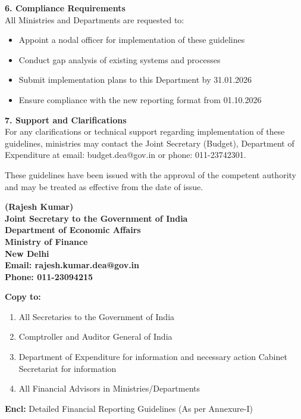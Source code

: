 \documentclass[12pt,a4paper]{article}
\newcommand{\officeline}[1]{\textbf{#1}}
\begin{document}
\vspace{0.3cm}

\officeline{6. Compliance Requirements}\\
All Ministries and Departments are requested to:

\begin{itemize}
    \item Appoint a nodal officer for implementation of these guidelines
    \item Conduct gap analysis of existing systems and processes
    \item Submit implementation plans to this Department by 31.01.2026
    \item Ensure compliance with the new reporting format from 01.10.2026
\end{itemize}

\vspace{0.3cm}

\officeline{7. Support and Clarifications}\\
For any clarifications or technical support regarding implementation of these guidelines, ministries may contact the Joint Secretary (Budget), Department of Expenditure at email: budget.dea@gov.in or phone: 011-23742301.

\vspace{0.5cm}

These guidelines have been issued with the approval of the competent authority and may be treated as effective from the date of issue.

\vspace{1cm}

\begin{flushleft}
\officeline{(Rajesh Kumar)}\\
\officeline{Joint Secretary to the Government of India}\\
\officeline{Department of Economic Affairs}\\
\officeline{Ministry of Finance}\\
\officeline{New Delhi}\\[0.3cm]
\officeline{Email: rajesh.kumar.dea@gov.in}\\
\officeline{Phone: 011-23094215}
\end{flushleft}

\vspace{1cm}

\noindent
\officeline{Copy to:}
\begin{enumerate}
    \item All Secretaries to the Government of India
    \item Comptroller and Auditor General of India
    \item Department of Expenditure for information and necessary action
    \file Cabinet Secretariat for information
    \item All Financial Advisors in Ministries/Departments
\end{enumerate}

\vspace{0.5cm}

\noindent
\officeline{Encl:} Detailed Financial Reporting Guidelines (As per Annexure-I)
\end{document}
